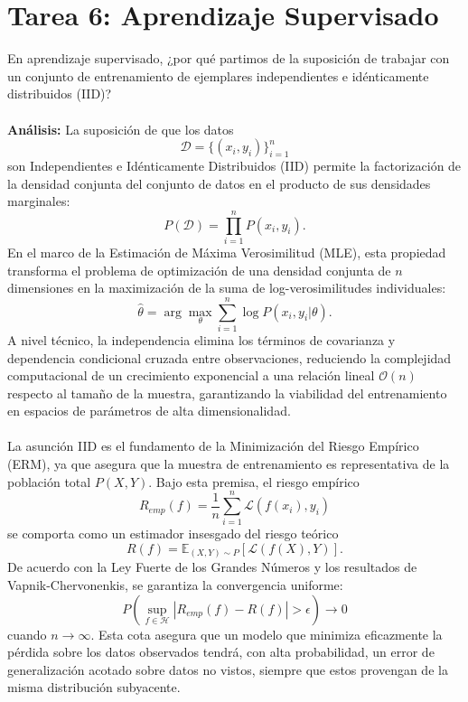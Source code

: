 \documentclass{article}
\begin{document}
\section{Tarea 6: Aprendizaje Supervisado}
\noindent En aprendizaje supervisado, ¿por qué partimos de la suposición de trabajar con un conjunto de entrenamiento de ejemplares independientes e idénticamente distribuidos (IID)?\\ \\
\textbf{Análisis:} La suposición de que los datos \[\mathcal{D} = \{(x_i, y_i)\}_{i=1}^n\] son Independientes e Idénticamente Distribuidos (IID) permite la factorización de la densidad conjunta del conjunto de datos en el producto de sus densidades marginales: \[P(\mathcal{D}) = \prod_{i=1}^n P(x_i, y_i).\] En el marco de la Estimación de Máxima Verosimilitud (MLE), esta propiedad transforma el problema de optimización de una densidad conjunta de $n$ dimensiones en la maximización de la suma de log-verosimilitudes individuales: \[\hat{\theta} = \arg\max_{\theta} \sum_{i=1}^n \log P(x_i, y_i | \theta).\] A nivel técnico, la independencia elimina los términos de covarianza y dependencia condicional cruzada entre observaciones, reduciendo la complejidad computacional de un crecimiento exponencial a una relación lineal $\mathcal{O}(n)$ respecto al tamaño de la muestra, garantizando la viabilidad del entrenamiento en espacios de parámetros de alta dimensionalidad. \\ \\
La asunción IID es el fundamento de la Minimización del Riesgo Empírico (ERM), ya que asegura que la muestra de entrenamiento es representativa de la población total $P(X,Y)$. Bajo esta premisa, el riesgo empírico \[R_{emp}(f) = \frac{1}{n} \sum_{i=1}^n \mathcal{L}(f(x_i), y_i)\] se comporta como un estimador insesgado del riesgo teórico \[R(f) = \mathbb{E}_{(X,Y)\sim P}[\mathcal{L}(f(X), Y)].\] De acuerdo con la Ley Fuerte de los Grandes Números y los resultados de Vapnik-Chervonenkis, se garantiza la convergencia uniforme: \[P(\sup_{f \in \mathcal{H}} |R_{emp}(f) - R(f)| > \epsilon) \to 0\] cuando $n \to \infty$. Esta cota asegura que un modelo que minimiza eficazmente la pérdida sobre los datos observados tendrá, con alta probabilidad, un error de generalización acotado sobre datos no vistos, siempre que estos provengan de la misma distribución subyacente.
\end{document}
